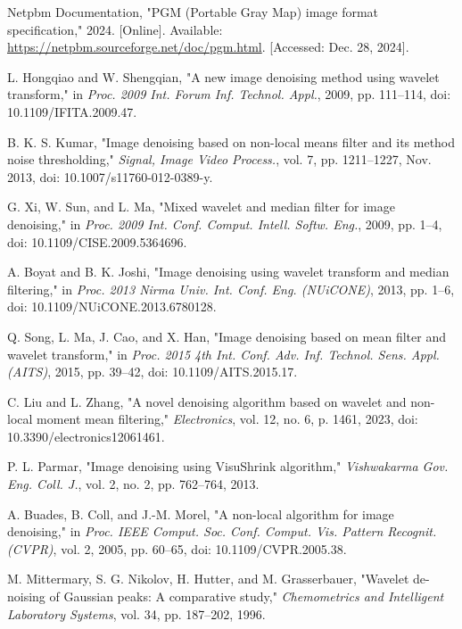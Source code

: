\documentclass[
  11pt,
]{article}
\begin{document}
\renewcommand{\refname}{\textbf{References}}
\begin{thebibliography}{}

Netpbm Documentation, "PGM (Portable Gray Map) image format specification," 2024. [Online]. Available: \url{https://netpbm.sourceforge.net/doc/pgm.html}. [Accessed: Dec. 28, 2024].

L. Hongqiao and W. Shengqian, "A new image denoising method using wavelet transform," in  \textit{Proc. 2009 Int. Forum Inf. Technol. Appl.}, 2009, pp. 111–114, doi: 10.1109/IFITA.2009.47.

B. K. S. Kumar, "Image denoising based on non-local means filter and its method noise thresholding,"  \textit{Signal, Image Video Process.}, vol. 7, pp. 1211–1227, Nov. 2013, doi: 10.1007/s11760-012-0389-y.

G. Xi, W. Sun, and L. Ma, "Mixed wavelet and median filter for image denoising," in  \textit{Proc. 2009 Int. Conf. Comput. Intell. Softw. Eng.}, 2009, pp. 1–4, doi: 10.1109/CISE.2009.5364696.

A. Boyat and B. K. Joshi, "Image denoising using wavelet transform and median filtering," in  \textit{Proc. 2013 Nirma Univ. Int. Conf. Eng. (NUiCONE)}, 2013, pp. 1–6, doi: 10.1109/NUiCONE.2013.6780128.

Q. Song, L. Ma, J. Cao, and X. Han, "Image denoising based on mean filter and wavelet transform," in  \textit{Proc. 2015 4th Int. Conf. Adv. Inf. Technol. Sens. Appl. (AITS)}, 2015, pp. 39–42, doi: 10.1109/AITS.2015.17.

C. Liu and L. Zhang, "A novel denoising algorithm based on wavelet and non-local moment mean filtering,"  \textit{Electronics}, vol. 12, no. 6, p. 1461, 2023, doi: 10.3390/electronics12061461.

P. L. Parmar, "Image denoising using VisuShrink algorithm," \textit{Vishwakarma Gov. Eng. Coll. J.}, vol. 2, no. 2, pp. 762–764, 2013.

A. Buades, B. Coll, and J.-M. Morel, "A non-local algorithm for image denoising," in \textit{Proc. IEEE Comput. Soc. Conf. Comput. Vis. Pattern Recognit. (CVPR)}, vol. 2, 2005, pp. 60–65, doi: 10.1109/CVPR.2005.38.

M. Mittermary, S. G. Nikolov, H. Hutter, and M. Grasserbauer, "Wavelet de-noising of Gaussian peaks: A comparative study," \textit{Chemometrics and Intelligent Laboratory Systems}, vol. 34, pp. 187--202, 1996.


\end{thebibliography}
\end{document}
